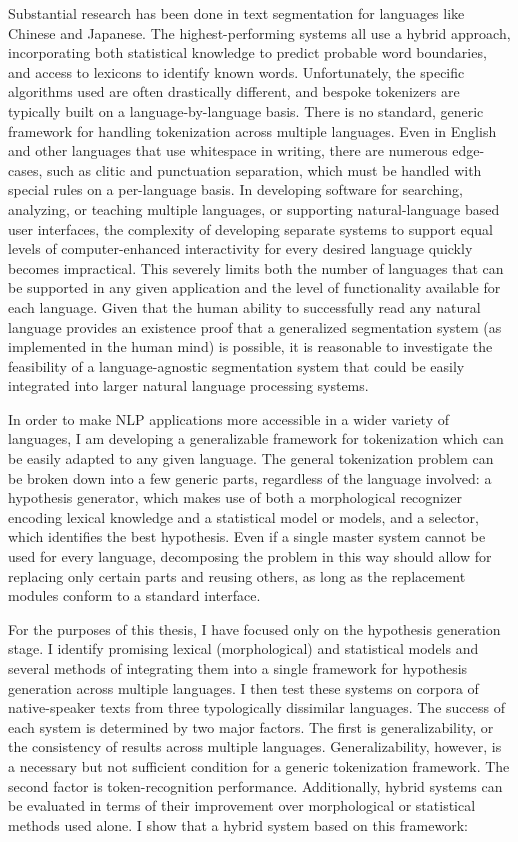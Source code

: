 Substantial research has been done in text segmentation for languages like Chinese and Japanese. The highest-performing systems all use a hybrid approach, incorporating both statistical knowledge to predict probable word boundaries, and access to lexicons to identify known words. Unfortunately, the specific algorithms used are often drastically different, and bespoke tokenizers are typically built on a language-by-language basis. There is no standard, generic framework for handling tokenization across multiple languages. Even in English and other languages that use whitespace in writing, there are numerous edge-cases, such as clitic and punctuation separation, which must be handled with special rules on a per-language basis. In developing software for searching, analyzing, or teaching multiple languages, or supporting natural-language based user interfaces, the complexity of developing separate systems to support equal levels of computer-enhanced interactivity for every desired language quickly becomes impractical. This severely limits both the number of languages that can be supported in any given application and the level of functionality available for each language. Given that the human ability to successfully read any natural language provides an existence proof that a generalized segmentation system (as implemented in the human mind) is possible, it is reasonable to investigate the feasibility of a language-agnostic segmentation system that could be easily integrated into larger natural language processing systems.

In order to make NLP applications more accessible in a wider variety of languages, I am developing a generalizable framework for tokenization which can be easily adapted to any given language. The general tokenization problem can be broken down into a few generic parts, regardless of the language involved: a hypothesis generator, which makes use of both a morphological recognizer encoding lexical knowledge and a statistical model or models, and a selector, which identifies the best hypothesis. Even if a single master system cannot be used for every language, decomposing the problem in this way should allow for replacing only certain parts and reusing others, as long as the replacement modules conform to a standard interface.

For the purposes of this thesis, I have focused only on the hypothesis generation stage. I identify promising lexical (morphological) and statistical models and several methods of integrating them into a single framework for hypothesis generation across multiple languages. I then test these systems on corpora of native-speaker texts from three typologically dissimilar languages. The success of each system is determined by two major factors. The first is generalizability, or the consistency of results across multiple languages. Generalizability, however, is a necessary but not sufficient condition for a generic tokenization framework. The second factor is token-recognition performance. Additionally, hybrid systems can be evaluated in terms of their improvement over morphological or statistical methods used alone. I show that a hybrid system based on this framework:

